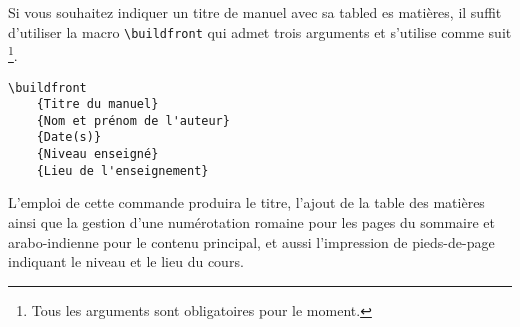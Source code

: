 Si vous souhaitez indiquer un titre de manuel avec sa tabled es matières, il suffit d'utiliser la macro \verb+\buildfront+ qui admet trois arguments et s'utilise comme suit
\footnote{
    Tous les arguments sont obligatoires pour le moment.
}.


\begin{frame-gene}
    \begin{verbatim}
\buildfront
    {Titre du manuel}
    {Nom et prénom de l'auteur}
    {Date(s)}
    {Niveau enseigné}
    {Lieu de l'enseignement}\end{verbatim}
\end{frame-gene}


L'emploi de cette commande produira le titre, l'ajout de la table des matières ainsi que la gestion d'une numérotation romaine pour les pages du sommaire et arabo-indienne pour le contenu principal, et aussi l'impression de pieds-de-page indiquant le niveau et le lieu du cours.
